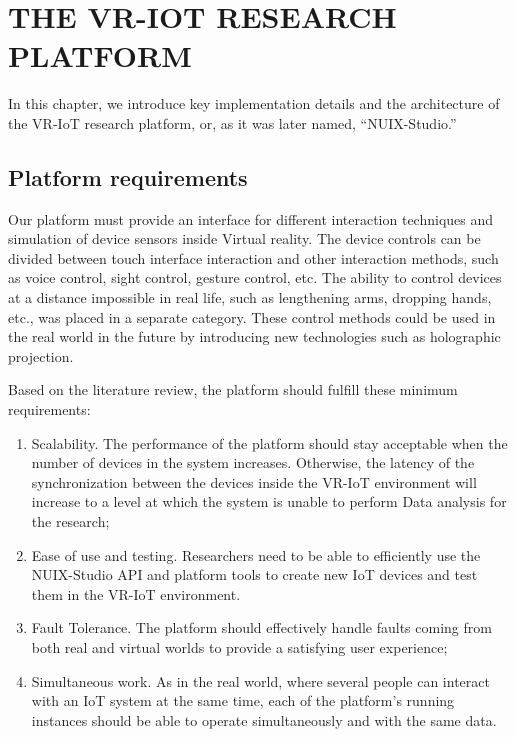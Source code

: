 
\chapter{\MakeUppercase{The VR-IoT Research Platform}}

In this chapter, we introduce key implementation details and the architecture of the VR-IoT research platform, or, as it was later named, ``NUIX-Studio.''

\section{Platform requirements}

Our platform must provide an interface for different interaction techniques and simulation of device sensors inside Virtual reality. The device controls can be divided between touch interface interaction and other interaction methods, such as voice control, sight control, gesture control, etc. The ability to control devices at a distance impossible in real life, such as lengthening arms, dropping hands, etc., was placed in a separate category. These control methods could be used in the real world in the future by introducing new technologies such as holographic projection.

Based on the literature review, the platform should fulfill these minimum requirements:
\begin{enumerate}
\item Scalability. The performance of the platform should stay acceptable when the number of devices in the system increases. Otherwise, the latency of the synchronization between the devices inside the VR-IoT environment will increase to a level at which the system is unable to perform Data analysis for the research;
\item Ease of use and testing. Researchers need to be able to efficiently use the NUIX-Studio API and platform tools to create new IoT devices and test them in the VR-IoT environment.
\item Fault Tolerance. The platform should effectively handle faults coming from both real and virtual worlds to provide a satisfying user experience;
\item Simultaneous work. As in the real world, where several people can interact with an IoT system at the same time, each of the platform's running instances should be able to operate simultaneously and with the same data.
\end{enumerate}

